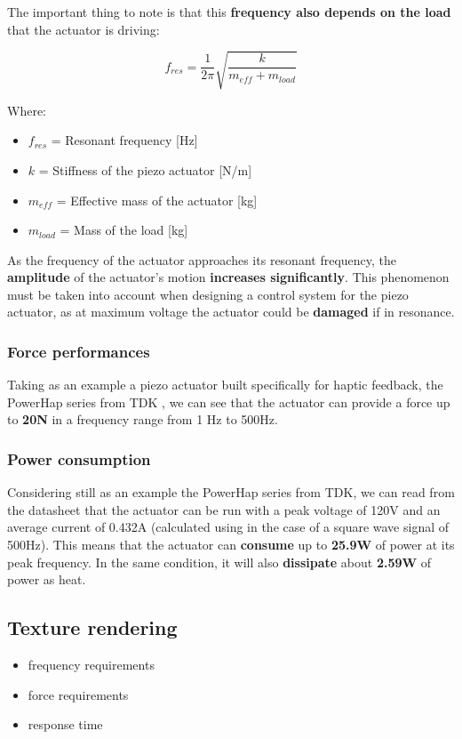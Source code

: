 \begin{samepage}
    The important thing to note is that this \textbf{frequency also depends on the load} that the actuator is driving:
    \nopagebreak

    \begin{equation}
        f_{res} = \frac{1}{2\pi} \sqrt{\frac{k}{m_{eff}+m_{load}}}
    \end{equation}
    \nopagebreak

    Where:
    \nopagebreak

    \begin{itemize}
        \item \( f_{res} \) = Resonant frequency [Hz]
        \item \( k \) = Stiffness of the piezo actuator [N/m]
        \item \( m_{eff} \) = Effective mass of the actuator [kg]
        \item \( m_{load} \) = Mass of the load [kg]
    \end{itemize}
\end{samepage}


As the frequency of the actuator approaches its resonant frequency, the \textbf{amplitude} of the actuator's motion \textbf{increases significantly}. This phenomenon must be taken into account when designing a control system for the piezo actuator, as at maximum voltage the actuator could be \textbf{damaged} if in resonance.

\subsubsection{Force performances}
Taking as an example a piezo actuator built specifically for haptic feedback, the PowerHap series from TDK \cite{Piezo_Haptic_Actuator}, we can see that the actuator can provide a force up to \textbf{20N} in a frequency range from 1 Hz to 500Hz.

\subsubsection{Power consumption}
Considering still as an example the PowerHap series from TDK, we can read from the datasheet that the actuator can be run with a peak voltage of 120V and an average current of 0.432A (calculated using \cite{Power_piezo_calculator} in the case of a square wave signal of 500Hz). This means that the actuator can \textbf{consume} up to \textbf{25.9W} of power at its peak frequency.
In the same condition, it will also \textbf{dissipate} about \textbf{2.59W} of power as heat.

\subsection{Texture rendering} %
\begin{itemize}
    \item frequency requirements
    \item force requirements
    \item response time
\end{itemize}

